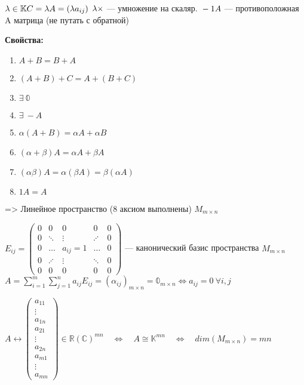 \( \lambda \in \mathbb{K} \newline
C = \lambda A = (\lambda a_{ij})\)
$\newline \lambda \times$ --- умножение на скаляр.
\(\newline -1 A \) --- противоположная A матрица (не путать с обратной)


\textbf{Свойства:}
\begin{enumerate}
    \item $ A+B = B+A $
    \item $ (A+B)+C = A+(B+C) $
    \item $ \exists \ \mathbb{0} $
    \item $ \exists \ -A $
    \item $ \alpha(A + B) = \alpha A + \alpha B $
    \item $ (\alpha + \beta)A = \alpha A + \beta A $
    \item $ (\alpha \beta)A = \alpha( \beta A ) = \beta( \alpha A )$
    \item $ 1A = A $

\end{enumerate} => Линейное пространство (8 аксиом выполнены) $ M_{m \times n}$

\( E_{ij} =
\begin{pmatrix}
    0 & 0       & 0          & 0       & 0 \\
    0 & \ddots  & \vdots     & \iddots & 0 \\
    0 & \ldots  & a_{ij} = 1 & \ldots  & 0 \\
    0 & \iddots & \vdots     & \ddots  & 0 \\
    0 & 0       & 0          & 0       & 0
\end{pmatrix}
\) --- канонический базис пространства $ M_{m \times n}$
\( A = \displaystyle{\sum^m_{i=1}\sum^{n}_{j=1}a_{ij}E_{ij}} = (\alpha_{ij})_{m \times n} = \mathbb{0}_{m \times n} \Leftrightarrow a_{ij} = 0 \ \forall i,j\)

\( A \leftrightarrow
\begin{pmatrix}
    a_{11} \\
    \vdots \\
    a_{1n} \\
    a_{21} \\
    \vdots \\
    a_{2n} \\
    a_{m1} \\
    \vdots \\
    a_{mn}
\end{pmatrix} \in \mathbb{R(C)}^{mn}
\quad \Leftrightarrow \quad A \cong \mathbb{K}^{mn}
\quad \Leftrightarrow \quad dim(M_{m \times n}) = mn\)

